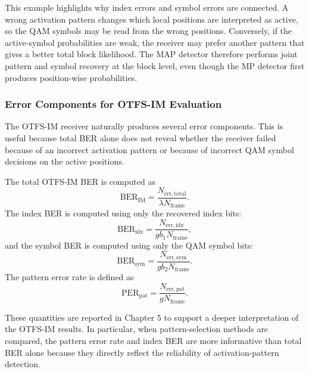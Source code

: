 This example highlights why index errors and symbol errors are connected. A wrong activation pattern changes which local positions are interpreted as active, so the QAM symbols may be read from the wrong positions. Conversely, if the active-symbol probabilities are weak, the receiver may prefer another pattern that gives a better total block likelihood. The MAP detector therefore performs joint pattern and symbol recovery at the block level, even though the MP detector first produces position-wise probabilities.

\subsubsection{Error Components for OTFS-IM Evaluation}

The OTFS-IM receiver naturally produces several error components. This is useful because total BER alone does not reveal whether the receiver failed because of an incorrect activation pattern or because of incorrect QAM symbol decisions on the active positions.

The total OTFS-IM BER is computed as
\begin{equation}
    \mathrm{BER}_{\mathrm{IM}}
    =
    \frac{
    N_{\mathrm{err,total}}
    }{
    \lambda N_{\mathrm{frame}}
    }.
    \label{eq:otfs_im_total_ber}
\end{equation}
The index BER is computed using only the recovered index bits:
\begin{equation}
    \mathrm{BER}_{\mathrm{idx}}
    =
    \frac{
    N_{\mathrm{err,idx}}
    }{
    g b_1 N_{\mathrm{frame}}
    },
    \label{eq:otfs_im_index_ber}
\end{equation}
and the symbol BER is computed using only the QAM symbol bits:
\begin{equation}
    \mathrm{BER}_{\mathrm{sym}}
    =
    \frac{
    N_{\mathrm{err,sym}}
    }{
    g b_2 N_{\mathrm{frame}}
    }.
    \label{eq:otfs_im_symbol_ber}
\end{equation}
The pattern error rate is defined as
\begin{equation}
    \mathrm{PER}_{\mathrm{pat}}
    =
    \frac{
    N_{\mathrm{err,pat}}
    }{
    gN_{\mathrm{frame}}
    }.
    \label{eq:otfs_im_pattern_error_rate}
\end{equation}

These quantities are reported in Chapter 5 to support a deeper interpretation of the OTFS-IM results. In particular, when pattern-selection methods are compared, the pattern error rate and index BER are more informative than total BER alone because they directly reflect the reliability of activation-pattern detection.
